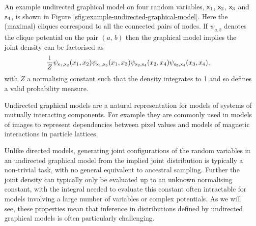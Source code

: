 An example undirected graphical model on four random variables, $\mathsf{x}_1$, $\mathsf{x}_2$, $\mathsf{x}_3$ and $\mathsf{x}_4$, is shown in Figure \ref{sfig:example-undirected-graphical-model}. Here the (maximal) cliques correspond to all the connected pairs of nodes. If $\psi_{a,b}$ denotes the clique potential on the pair $(a,\,b)$ then the graphical model implies the joint density can be factorised as
\begin{equation}\label{eq:example-undirected-graphical-model-factorisation}
\begin{split}
  \frac{1}{Z} 
  \psi_{\mathsf{x}_1,\mathsf{x}_2}(x_1,x_2)
  \psi_{\mathsf{x}_1,\mathsf{x}_3}(x_1,x_3)
  \psi_{\mathsf{x}_2,\mathsf{x}_4}(x_2,x_4)
  \psi_{\mathsf{x}_3,\mathsf{x}_4}(x_3,x_4),
\end{split}
\end{equation}
with $Z$ a normalising constant such that the density integrates to 1 and so defines a valid probability measure.

Undirected graphical models are a natural representation for models of systems of mutually interacting components. For example they are commonly used in models of images to represent dependencies between pixel values and models of magnetic interactions in particle lattices. 

Unlike directed models, generating joint configurations of the random variables in an undirected graphical model from the implied joint distribution is typically a non-trivial task, with no general equivalent to ancestral sampling. Further the joint density can typically only be evaluated up to an unknown normalising constant, with the integral needed to evaluate this constant often intractable for models involving a large number of variables or complex potentials. As we will see, these properties mean that inference in distributions defined by undirected graphical models is often particularly challenging.

